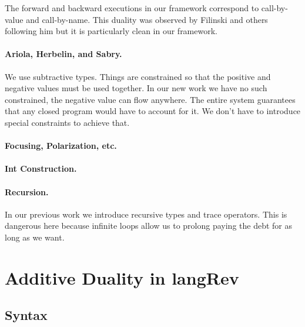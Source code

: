 \documentclass[preprint]{sigplanconf}
\begin{document}
The forward and backward executions in our framework correspond to
call-by-value and call-by-name. This duality was observed by Filinski and
others following him but it is particularly clean in our framework.



\paragraph*{Ariola, Herbelin, and Sabry.} We use subtractive types. Things
are constrained so that the positive and negative values must be used
together. In our new work we have no such constrained, the negative value can
flow anywhere. The entire system guarantees that any closed program would
have to account for it. We don't have to introduce special constraints to
achieve that.

\paragraph*{Focusing, Polarization, etc.}

\paragraph*{Int Construction.}

\paragraph*{Recursion.} In our previous work we introduce recursive types and
trace operators. This is dangerous here because infinite loops allow us to
prolong paying the debt for as long as we want.

\section{Additive Duality in {{langRev}} }

\subsection{Syntax}

%
%
%
\end{document}
